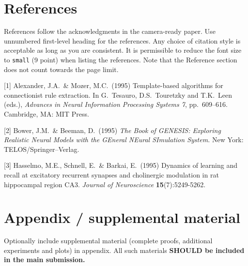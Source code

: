 \documentclass{article}
\begin{document}
\section*{References}


References follow the acknowledgments in the camera-ready paper. Use unnumbered first-level heading for
the references. Any choice of citation style is acceptable as long as you are
consistent. It is permissible to reduce the font size to \verb+small+ (9 point)
when listing the references.
Note that the Reference section does not count towards the page limit.
\medskip


{
\small


[1] Alexander, J.A.\ \& Mozer, M.C.\ (1995) Template-based algorithms for
connectionist rule extraction. In G.\ Tesauro, D.S.\ Touretzky and T.K.\ Leen
(eds.), {\it Advances in Neural Information Processing Systems 7},
pp.\ 609--616. Cambridge, MA: MIT Press.


[2] Bower, J.M.\ \& Beeman, D.\ (1995) {\it The Book of GENESIS: Exploring
  Realistic Neural Models with the GEneral NEural SImulation System.}  New York:
TELOS/Springer--Verlag.


[3] Hasselmo, M.E., Schnell, E.\ \& Barkai, E.\ (1995) Dynamics of learning and
recall at excitatory recurrent synapses and cholinergic modulation in rat
hippocampal region CA3. {\it Journal of Neuroscience} {\bf 15}(7):5249-5262.
}



\appendix

\section{Appendix / supplemental material}


Optionally include supplemental material (complete proofs, additional experiments and plots) in appendix.
All such materials \textbf{SHOULD be included in the main submission.}

\end{document}
